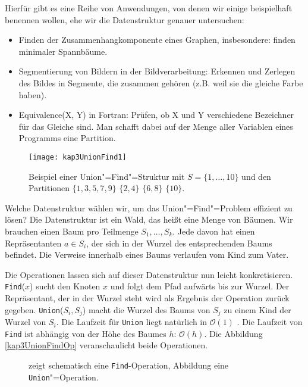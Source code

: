 Hierfür gibt es eine Reihe von Anwendungen, von denen wir einige beispielhaft benennen wollen, ehe wir die Datenstruktur genauer untersuchen:
\begin{itemize}
  \item Finden der Zusammenhangkomponente eines Graphen, insbesondere: finden minimaler Spannbäume.
  \item Segmentierung von Bildern in der Bildverarbeitung: Erkennen und Zerlegen des Bildes in Segmente, die zusammen gehören (z.B. weil sie die gleiche Farbe haben).
  \item Equivalence(X, Y) in Fortran: Prüfen, ob X und Y verschiedene Bezeichner für das Gleiche sind. Man schafft dabei auf der Menge aller Variablen eines Programms eine Partition.
\end{itemize}

\begin{figure}[htb]
  \centering
  \texttt{[image: kap3UnionFind1]}
  \caption{Beispiel einer Union"=Find"=Struktur mit $S= \{1, \ldots, 10 \}$ und den Partitionen $\{1, 3, 5, 7, 9\}$ $\{2, 4\}$ $\{6, 8\}$ $\{10\}$.}
  \label{kap3UnionFind1}
\end{figure}

Welche Datenstruktur wählen wir, um das Union"=Find"=Problem effizient zu lösen? Die Datenstruktur ist ein Wald, das heißt eine Menge von Bäumen. Wir brauchen einen Baum pro Teilmenge $S_1, \ldots, S_k$. Jede davon hat einen Repräsentanten $a \in S_i$, der sich in der Wurzel des entsprechenden Baums befindet. Die Verweise innerhalb eines Baums verlaufen vom Kind zum Vater.

Die Operationen lassen sich auf dieser Datenstruktur nun leicht konkretisieren. \texttt{Find}($x$) sucht den Knoten $x$ und folgt dem Pfad aufwärts bis zur Wurzel. Der Repräsentant, der in der Wurzel steht wird als Ergebnis der Operation zurück gegeben. \texttt{Union}($S_i, S_j$) macht die Wurzel des Baums von $S_j$ zu einem Kind der Wurzel von $S_i$. Die Laufzeit für \texttt{Union} liegt natürlich in $\mathcal{O}(1)$ . Die Laufzeit von \texttt{Find} ist abhängig von der Höhe des Baumes $h$: $\mathcal{O}(h)$. Die Abbildung \vref{kap3UnionFindOp} veranschaulicht beide Operationen.

\begin{figure}[htb]
  \centering
  \hspace{3em}
  \caption{ zeigt schematisch eine \texttt{Find}-Operation, Abbildung  eine \texttt{Union}"=Operation.}
  \label{kap3UnionFindOp}
\end{figure}

